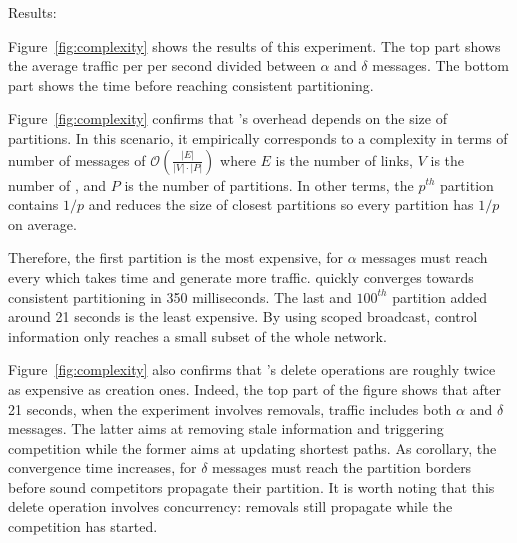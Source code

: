 \begin{asparadesc}
\begin{figure}
\end{figure}

\item [Results:]

Figure~\ref{fig:complexity} shows the results of this experiment. The
top part shows the average traffic per \process per second divided
between $\alpha$ and $\delta$ messages. The bottom part shows the time
before reaching consistent partitioning.

\noindent Figure~\ref{fig:complexity} confirms that \NAME's overhead
depends on the size of partitions. In this scenario, it empirically
corresponds to a complexity in terms of number of messages of
$\mathcal{O}(\frac{|E|}{|V|\cdot|P|})$ where $E$ is the number of
links, $V$ is the number of \processes, and $P$ is the number of
partitions. In other terms, the $p^{th}$ partition contains $1/p$
\processes and reduces the size of closest partitions so every
partition has $1/p$ \processes on average.
  
\noindent Therefore, the first partition is the most expensive, for
$\alpha$ messages must reach every \process which takes time and
generate more traffic.  \NAME quickly converges towards consistent
partitioning in 350 milliseconds.
The last and $100^{th}$ partition
added around 21 seconds is the least expensive. By using scoped
broadcast, control information only reaches a small subset of the
whole network.

\noindent Figure~\ref{fig:complexity} also confirms that \NAME's
delete operations are roughly twice as expensive as creation
ones. Indeed, the top part of the figure shows that after 21 seconds,
when the experiment involves removals, traffic includes both
$\alpha$ and $\delta$ messages. The latter aims at removing stale
information and triggering competition while the former aims at
updating shortest paths. As corollary, the convergence time increases,
for $\delta$ messages must reach the partition borders before sound
competitors propagate their partition. It is worth noting that this
delete operation involves concurrency: removals still propagate while
the competition has started.


\end{asparadesc}
